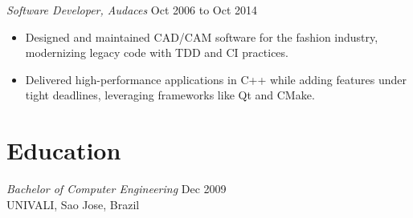 \documentclass[line,margin]{res}
\begin{document}
\begin{resume}
                {\sl Software Developer, Audaces} \hfill Oct 2006 to Oct 2014 \\
                  \begin{itemize}
                   \item Designed and maintained CAD/CAM software for the fashion industry, modernizing legacy code with TDD and CI practices.
\item Delivered high-performance applications in C++ while adding features under tight deadlines, leveraging frameworks like Qt and CMake.              
\end{itemize}
\section{Education} {\sl Bachelor of Computer Engineering} \hfill Dec 2009\\
                UNIVALI, Sao Jose, Brazil
\end{resume}
\end{document}
